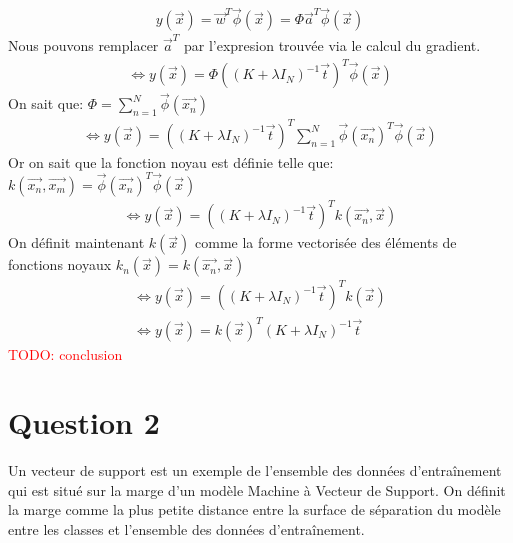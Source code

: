 \begin{equation}
\begin{split}
	y(\overrightarrow{x}) = \overrightarrow{w}^T \overrightarrow{\phi}(\overrightarrow{x}) = \Phi \overrightarrow{a}^T \overrightarrow{\phi}(\overrightarrow{x})
\end{split}
\end{equation}
Nous pouvons remplacer $\overrightarrow{a}^T$ par l'expresion trouvée via le calcul du gradient.
\begin{equation}
\begin{split}
	\iff y(\overrightarrow{x}) = \Phi \left((K + \lambda I_N)^{-1} \overrightarrow{t}\right)^T \overrightarrow{\phi}(\overrightarrow{x})
\end{split}
\end{equation}
On sait que: $\Phi = \sum_{n=1}^N \overrightarrow{\phi}(\overrightarrow{x_n})$
\begin{equation}
\begin{split}
	\iff y(\overrightarrow{x}) = \left((K + \lambda I_N)^{-1} \overrightarrow{t}\right)^T \sum_{n=1}^N \overrightarrow{\phi}(\overrightarrow{x_n})^T\overrightarrow{\phi}(\overrightarrow{x})
\end{split}
\end{equation}
Or on sait que la fonction noyau est définie telle que: $k(\overrightarrow{x_n}, \overrightarrow{x_m}) = \overrightarrow{\phi}(\overrightarrow{x_n})^T \overrightarrow{\phi}(\overrightarrow{x})$
\begin{equation}
\begin{split}
	\iff y(\overrightarrow{x}) = \left((K + \lambda I_N)^{-1} \overrightarrow{t}\right)^T k(\overrightarrow{x_n}, \overrightarrow{x})
\end{split}
\end{equation}
On définit maintenant $k(\overrightarrow{x})$ comme la forme vectorisée des éléments de fonctions noyaux $ k_n(\overrightarrow{x}) = k(\overrightarrow{x_n}, \overrightarrow{x}) $
\begin{equation}
\begin{split}
	\iff y(\overrightarrow{x}) = \left((K + \lambda I_N)^{-1} \overrightarrow{t}\right)^T k(\overrightarrow{x}) \\
	\iff y(\overrightarrow{x}) = k(\overrightarrow{x})^T (K+\lambda I_N)^{-1} \overrightarrow{t}
\end{split}
\end{equation}
\textcolor{red}{TODO: conclusion}

\section{Question 2}
Un vecteur de support est un exemple de l'ensemble des données d'entraînement qui est situé sur la marge d'un modèle Machine à Vecteur de Support. On définit la marge comme la plus petite distance entre la surface de séparation du modèle entre les classes et l'ensemble des données d'entraînement. 

